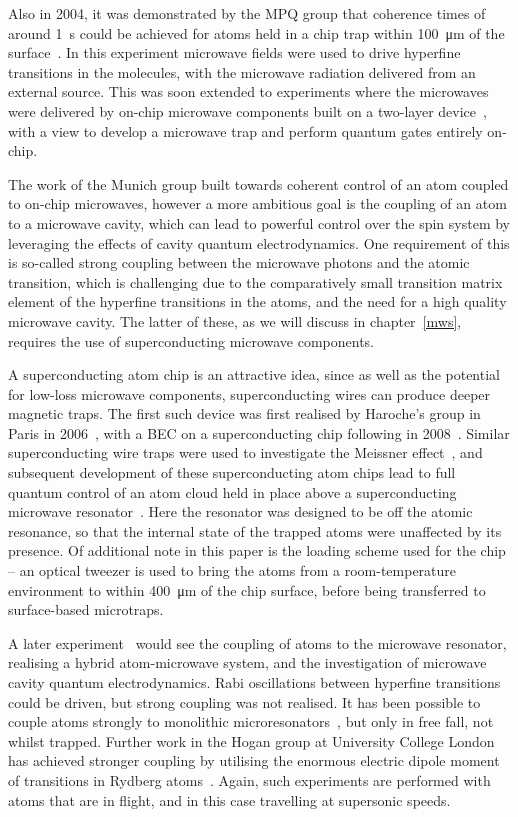 Also in 2004, it was demonstrated by the MPQ group that coherence times of
around \SI{1}{\second} could be achieved for \esRb{} atoms held in a chip trap
within \SI{100}{\micro\meter} of the surface~\cite{Treutlein2004}. In this
experiment microwave fields were used to drive hyperfine transitions in the
molecules, with the microwave radiation delivered from an external source. This
was soon extended to experiments where the microwaves were delivered by on-chip
microwave components built on a two-layer device~\cite{Treutlein2008,
Boehi2009}, with a view to develop a microwave trap and perform quantum
gates entirely on-chip.

The work of the Munich group built towards coherent control of an atom coupled
to on-chip microwaves, however a more ambitious goal is the coupling of an atom
to a microwave cavity, which can lead to powerful control over the spin system
by leveraging the effects of cavity quantum electrodynamics. One requirement of
this is so-called strong coupling between the microwave photons and the atomic
transition, which is challenging due to the comparatively small transition
matrix element of the hyperfine transitions in the atoms, and the need for a
high quality microwave cavity. The latter of these, as we will discuss in
chapter~\ref{mws}, requires the use of superconducting microwave components.

A superconducting atom chip is an attractive idea, since as well as the
potential for low-loss microwave components, superconducting wires can produce
deeper magnetic traps. The first such device was first realised by
Haroche's group in Paris in 2006~\cite{Nirrengarten2006}, with a BEC on a
superconducting chip following in 2008~\cite{Roux2008}. Similar superconducting
wire traps were used to investigate the Meissner
effect~\cite{PhysRevLett.101.183006}, and subsequent development of these
superconducting atom chips lead to full quantum control of an atom cloud held
in place above a superconducting microwave resonator~\cite{Bernon2013}. Here
the resonator was designed to be off the atomic resonance, so that the internal
state of the trapped atoms were unaffected by its presence. Of additional note
in this paper is the loading scheme used for the chip -- an optical tweezer is
used to bring the atoms from a room-temperature environment to within
\SI{400}{\micro\meter} of the chip surface, before being transferred to
surface-based microtraps.

A later experiment~\cite{Hattermann2017} would see the coupling of atoms to the
microwave resonator, realising a hybrid atom-microwave system, and the
investigation of microwave cavity quantum electrodynamics. Rabi oscillations
between hyperfine transitions could be driven, but strong coupling was not
realised. It has been possible to couple atoms strongly to monolithic
microresonators~\cite{Aoki2006}, but only in free fall, not whilst trapped.
Further work in the Hogan group at University College London has achieved
stronger coupling by utilising the enormous electric dipole moment of
transitions in Rydberg atoms~\cite{PhysRevLett.124.193604}. Again, such
experiments are performed with atoms that are in flight, and in this case
travelling at supersonic speeds.

